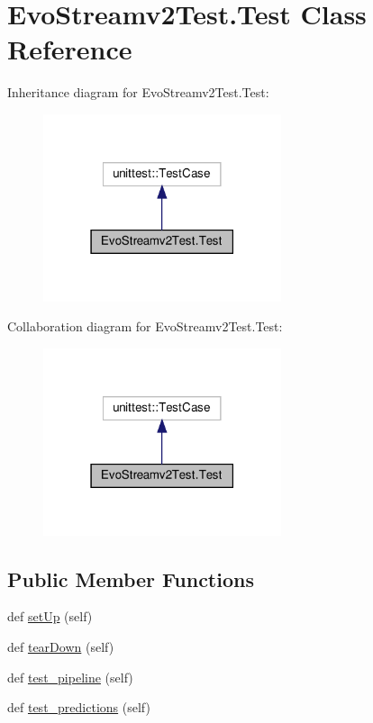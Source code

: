 \hypertarget{classEvoStreamv2Test_1_1Test}{}\section{Evo\+Streamv2\+Test.\+Test Class Reference}
\label{classEvoStreamv2Test_1_1Test}


Inheritance diagram for Evo\+Streamv2\+Test.\+Test\+:
\nopagebreak
\begin{figure}[H]
\begin{center}
\leavevmode
\includegraphics[width=198pt]{classEvoStreamv2Test_1_1Test__inherit__graph}
\end{center}
\end{figure}


Collaboration diagram for Evo\+Streamv2\+Test.\+Test\+:
\nopagebreak
\begin{figure}[H]
\begin{center}
\leavevmode
\includegraphics[width=198pt]{classEvoStreamv2Test_1_1Test__coll__graph}
\end{center}
\end{figure}
\subsection*{Public Member Functions}
\begin{DoxyCompactItemize}
\item 
def \hyperlink{classEvoStreamv2Test_1_1Test_a9c0b339c66c2208af3f7979b42e8c9b2}{set\+Up} (self)
\item 
def \hyperlink{classEvoStreamv2Test_1_1Test_acd9a0d03c63adb779ced285660d28d47}{tear\+Down} (self)
\item 
def \hyperlink{classEvoStreamv2Test_1_1Test_a0a76529e64d8314288fa33f367fb791b}{test\+\_\+pipeline} (self)
\item 
def \hyperlink{classEvoStreamv2Test_1_1Test_ad587395b5f6233e2018458e26b07bce1}{test\+\_\+predictions} (self)
\end{DoxyCompactItemize}
